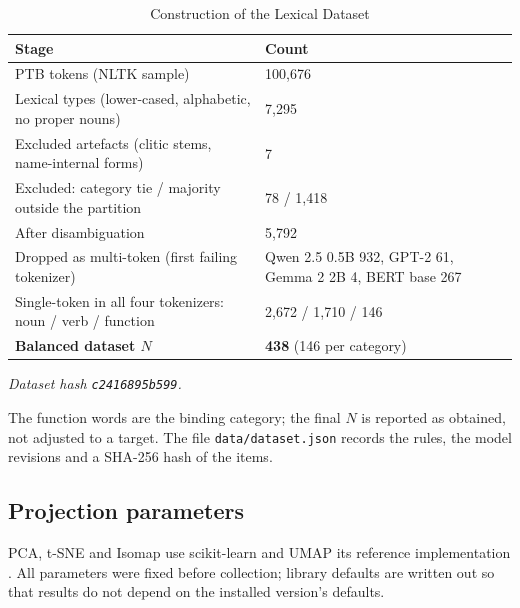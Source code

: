 \documentclass[conference,a4paper]{IEEEtran}
\begin{document}
\begin{table}[tp]
\centering
\caption{Construction of the Lexical Dataset}\label{tab:dataset}
\footnotesize
\begin{tabular*}{\textwidth}{@{\extracolsep{\fill}}ll@{}}
\toprule
Stage & Count \\
\midrule
PTB tokens (NLTK sample) & 100,676 \\
Lexical types (lower-cased, alphabetic, no proper nouns) & 7,295 \\
Excluded artefacts (clitic stems, name-internal forms) & 7 \\
Excluded: category tie / majority outside the partition & 78 / 1,418 \\
After disambiguation & 5,792 \\
Dropped as multi-token (first failing tokenizer) & Qwen 2.5 0.5B 932, GPT-2 61, Gemma 2 2B 4, BERT base 267 \\
Single-token in all four tokenizers: noun / verb / function & 2,672 / 1,710 / 146 \\
\textbf{Balanced dataset $N$} & \textbf{438} (146 per category) \\
\bottomrule
\end{tabular*}
\par\vspace{3pt}\parbox{\textwidth}{\scriptsize \emph{Dataset hash \texttt{c2416895b599}.}}
\end{table}

The function words are the binding category; the final \(N\) is reported
as obtained, not adjusted to a target. The file
\texttt{data/dataset.json} records the rules, the model revisions and a
SHA-256 hash of the items.

\subsection{Projection parameters}\label{sec:projection-parameters}

PCA, t-SNE and Isomap use scikit-learn \cite{r22} and UMAP its reference
implementation \cite{r9}. All parameters were fixed before collection;
library defaults are written out so that results do not depend on the
installed version's defaults.
\end{document}
